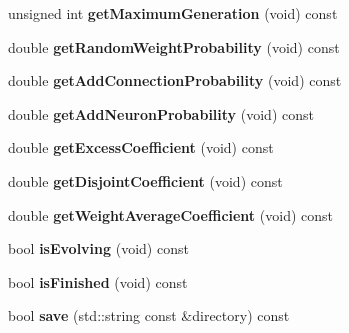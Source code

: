 \begin{DoxyCompactItemize}
\mbox{\label{class_indie_neat_1_1_neat_engine_abbaa7a50a64d1b0a511242fd9b16397b}} 
unsigned int {\bfseries get\+Maximum\+Generation} (void) const
\item 
\mbox{\label{class_indie_neat_1_1_neat_engine_ac52ab533bf06e49e6881d3f3be35f7ad}} 
double {\bfseries get\+Random\+Weight\+Probability} (void) const
\item 
\mbox{\label{class_indie_neat_1_1_neat_engine_ac9ad37b6bbad3b65c6cf925d01b7a45e}} 
double {\bfseries get\+Add\+Connection\+Probability} (void) const
\item 
\mbox{\label{class_indie_neat_1_1_neat_engine_af1fb8dbe2831bcde60a290d53a623dd7}} 
double {\bfseries get\+Add\+Neuron\+Probability} (void) const
\item 
\mbox{\label{class_indie_neat_1_1_neat_engine_af04e63309d1fd3288a1858b2332353d6}} 
double {\bfseries get\+Excess\+Coefficient} (void) const
\item 
\mbox{\label{class_indie_neat_1_1_neat_engine_a28823e1f447e4a4da95f623272f00be2}} 
double {\bfseries get\+Disjoint\+Coefficient} (void) const
\item 
\mbox{\label{class_indie_neat_1_1_neat_engine_af9199d878606632526eb7a6855bb3639}} 
double {\bfseries get\+Weight\+Average\+Coefficient} (void) const
\item 
\mbox{\label{class_indie_neat_1_1_neat_engine_a44132cde1d44edd870780c05eba29ba1}} 
bool {\bfseries is\+Evolving} (void) const
\item 
\mbox{\label{class_indie_neat_1_1_neat_engine_a72379a072d593db037c67badce123324}} 
bool {\bfseries is\+Finished} (void) const
\item 
\mbox{\label{class_indie_neat_1_1_neat_engine_aa806823e65622236d926d3787efa0b32}} 
bool {\bfseries save} (std\+::string const \&directory) const

\end{DoxyCompactItemize}
